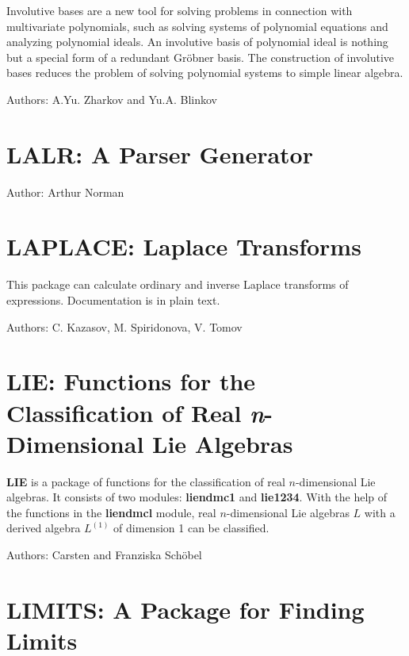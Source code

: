 Involutive bases are a new tool for solving problems in connection with
multivariate polynomials, such as solving systems of polynomial equations
and analyzing polynomial ideals.  An involutive basis of polynomial ideal
is nothing but a special form of a redundant Gr\"obner basis.  The
construction of involutive bases reduces the problem of solving polynomial
systems to simple linear algebra.

Authors: A.Yu. Zharkov and Yu.A. Blinkov



\newpage

\section{LALR: A Parser Generator}

Author: Arthur Norman



\newpage

\section{LAPLACE: Laplace Transforms}

This package can calculate ordinary and inverse Laplace transforms of
expressions.  Documentation is in plain text.

Authors: C. Kazasov, M. Spiridonova, V. Tomov



\newpage

\section{LIE: Functions for the Classification of Real \emph{n}-Dimensional Lie
Algebras}

\textbf{LIE} is a package of functions for the classification of real
$n$-dimensional Lie algebras.  It consists of two modules: \textbf{liendmc1}
and \textbf{lie1234}.  With the help of the functions in the \textbf{liendmcl}
module, real $n$-dimensional Lie algebras $L$ with a derived algebra
$L^{(1)}$ of dimension 1 can be classified.

Authors: Carsten and Franziska Sch\"obel



\newpage

\iffalse
\section{LIMITS: A Package for Finding Limits}


